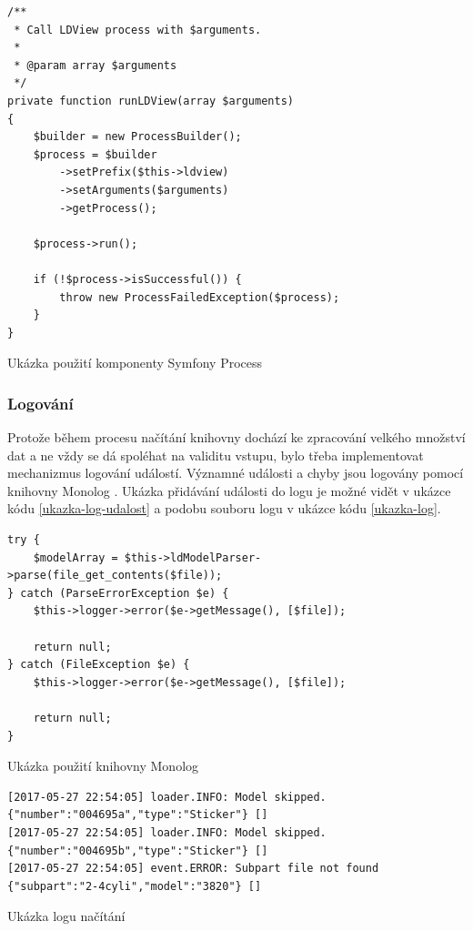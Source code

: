 \begin{listing}[htbp]
        \begin{verbatim}
/**
 * Call LDView process with $arguments.
 *
 * @param array $arguments
 */
private function runLDView(array $arguments)
{
    $builder = new ProcessBuilder();
    $process = $builder
        ->setPrefix($this->ldview)
        ->setArguments($arguments)
        ->getProcess();

    $process->run();

    if (!$process->isSuccessful()) {
        throw new ProcessFailedException($process);
    }
}
        \end{verbatim}
    \caption{Ukázka použití komponenty Symfony Process \label{ukazka-stlconverter}}
\end{listing}

\subsubsection*{Logování}
Protože během procesu načítání knihovny dochází ke zpracování velkého množství dat a ne vždy se dá spoléhat na validitu vstupu, bylo třeba implementovat mechanizmus logování událostí. Významné události a chyby jsou logovány pomocí knihovny Monolog \autocite{symfony:monolog}. Ukázka přidávání události do logu je možné vidět v ukázce kódu \ref{ukazka-log-udalost} a podobu souboru logu v ukázce kódu \ref{ukazka-log}.

\begin{listing}[htbp]
        \begin{verbatim}
try {
    $modelArray = $this->ldModelParser->parse(file_get_contents($file));
} catch (ParseErrorException $e) {
    $this->logger->error($e->getMessage(), [$file]);

    return null;
} catch (FileException $e) {
    $this->logger->error($e->getMessage(), [$file]);

    return null;
}
        \end{verbatim}
    \caption{Ukázka použití knihovny Monolog \label{ukazka-log-udalost}}
\end{listing}

\begin{listing}[htbp]
        \begin{verbatim}
[2017-05-27 22:54:05] loader.INFO: Model skipped. {"number":"004695a","type":"Sticker"} []
[2017-05-27 22:54:05] loader.INFO: Model skipped. {"number":"004695b","type":"Sticker"} []
[2017-05-27 22:54:05] event.ERROR: Subpart file not found {"subpart":"2-4cyli","model":"3820"} []
        \end{verbatim}
    \caption{Ukázka logu načítání\label{ukazka-log}}
\end{listing}

